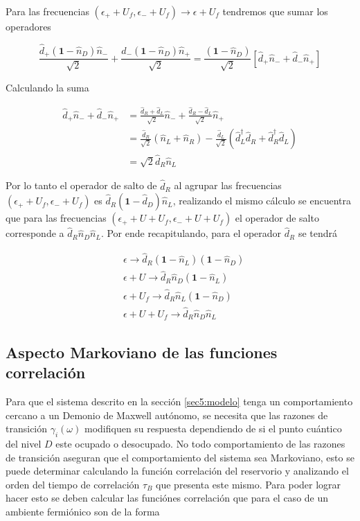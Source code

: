\begin{appendixs}
Para las frecuencias $(\epsilon_{+}+U_{f},\epsilon_{-}+U_{f})\to \epsilon + U_{f}$ tendremos que sumar los operadores

\begin{equation*}
    \frac{\hat{d}_{+}(\textbf{1}-\hat{n}_{D})\hat{n}_{-} }{\sqrt{2}} + \frac{\hat{d}_{-}(\textbf{1}-\hat{n}_{D})\hat{n}_{+} }{\sqrt{2}} = \frac{(\textbf{1}-\hat{n}_{D})}{\sqrt{2}} [\hat{d}_{+}\hat{n}_{-} + \hat{d}_{-}\hat{n}_{+}]
\end{equation*}

Calculando la suma

\begin{align*}
    \hat{d}_{+}\hat{n}_{-} + \hat{d}_{-}\hat{n}_{+} & = \frac{\hat{d}_{R}+\hat{d}_{L}}{\sqrt{2}}\hat{n}_{-} + \frac{\hat{d}_{R}-\hat{d}_{L}}{\sqrt{2}}\hat{n}_{+}  \\
    & = \frac{\hat{d}_{R}}{\sqrt{2}}(\hat{n}_{L}+\hat{n}_{R}) - \frac{\hat{d}_{L}}{\sqrt{2}}(\hat{d}^{\dagger}_{L}\hat{d}_{R}+\hat{d}^{\dagger}_{R}\hat{d}_{L}) \\
    & = \sqrt{2}\hat{d}_{R}\hat{n}_{L}
\end{align*}

Por lo tanto el operador de salto de $\hat{d}_{R}$ al agrupar las frecuencias $(\epsilon_{+}+U_{f},\epsilon_{-}+U_{f})$ es $\hat{d}_{R}(\textbf{1}-\hat{d}_{D})\hat{n}_{L}$, realizando el mismo cálculo se encuentra que para las frecuencias $(\epsilon_{+}+U+U_{f},\epsilon_{-}+U+U_{f})$ el operador de salto corresponde a $\hat{d}_{R}\hat{n}_{D}\hat{n}_{L}$. Por ende recapitulando, para el operador $\hat{d}_{R}$ se tendrá

\begin{align*}
    &\epsilon \to \hat{d}_{R}(\textbf{1}-\hat{n}_{L})(\textbf{1}-\hat{n}_{D})\\
   &\epsilon + U \to \hat{d}_{R}\hat{n}_{D}(\textbf{1}-\hat{n}_{L})\\
    &\epsilon +U_{f}\to \hat{d}_{R}\hat{n}_{L}(\textbf{1}-\hat{n}_{D})\\
    &\epsilon +U+U_{f}\to \hat{d}_{R}\hat{n}_{D}\hat{n}_{L}
\end{align*}

\label{apendix5frecuencygroup}

\subsection{Aspecto Markoviano de las funciones correlación }
Para que el sistema descrito en la sección \ref{sec5:modelo} tenga un comportamiento cercano a un Demonio de Maxwell autónomo, se necesita que las razones de transición $\gamma_{i}(\omega)$ modifiquen su respuesta dependiendo de si el punto cuántico del nivel $D$ este ocupado o desocupado. No todo comportamiento de las razones de transición aseguran que el comportamiento del sistema sea Markoviano, esto se puede determinar calculando la función correlación del reservorio y analizando el orden del tiempo de correlación $\tau_{B}$ que presenta este mismo. Para poder lograr hacer esto se deben calcular las funciónes correlación que para el caso de un ambiente fermiónico son de la forma


\end{appendixs}
